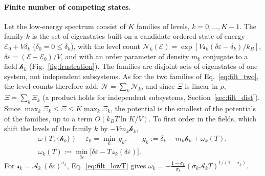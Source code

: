 \documentclass[10pt,a4paper]{article}
\theoremstyle{plain}
\newcommand{\cN}{\mathcal{N}}   %
\newcommand{\hfield}{\mathscr{h}}  %
\newcommand{\enrg}{\mathcal{E}}  %
\newcommand{\lds}{\mathscr{s}}  %
\begin{document}
\paragraph{Finite number of competing states.} Let the low-energy spectrum
consist of $K$ families of levels, $k=0,\dots,K-1$. The family $k$ is the
set of eigenstates built on a candidate ordered state of energy
$\enrg_0+V\delta_k$ ($\delta_0=0\le\delta_k$), with the level count
$\cN_k(\enrg)=\exp[V\lds_k(\delta\varepsilon-\delta_k)/k_B]$,
$\delta\varepsilon=(\enrg-\enrg_0)/V$, and with an order parameter of density
$m_k$ conjugate to a field $\hfield_k$ (Fig.~\ref{fig:frustration}). The
families are disjoint sets of eigenstates of one system, not independent
subsystems. As for the two families of Eq.~\eqref{eq:filt_two}, the level
counts therefore add, $\cN=\sum_k\cN_k$, and since $\Xi$ is linear in $\rho$,
$\Xi=\sum_k\Xi_k$ (a product holds for independent subsystems,
Section~\ref{sec:filt_dist}). Since
$\max_k\Xi_k\le\Xi\le K\max_k\Xi_k$, the potential is the smallest of the
potentials of the families, up to a term $O(k_BT\ln K/V)$. To first order
in the fields, which shift the levels of the family $k$ by $-Vm_k\hfield_k$,
\begin{equation}\label{eq:filt_compete}
\begin{gathered}
  \omega(T,\{\hfield_k\})-\varepsilon_0=\min_k\,g_k ,\qquad
  g_k:=\delta_k-m_k\hfield_k+\omega_k(T) ,
  \\
  \omega_k(T):=\min_{\delta\varepsilon}\big[\delta\varepsilon-T\,\lds_k(\delta\varepsilon)\big] .
\end{gathered}
\end{equation}
For $\lds_k=\mathcal{A}_k\,(\delta\varepsilon)^{\sigma_k}$,
Eq.~\eqref{eq:filt_lowT} gives
$\omega_k=-\tfrac{1-\sigma_k}{\sigma_k}(\sigma_k \mathcal{A}_k T)^{1/(1-\sigma_k)}$.
\end{document}
